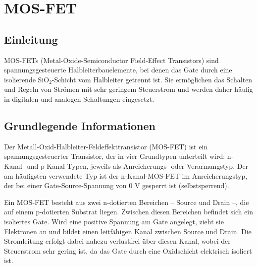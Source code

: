 %
%
%


\chapter{MOS-FET}\label{Mosfet}
\section{Einleitung}
MOS-FETs (Metal-Oxide-Semiconductor Field-Effect Transistors) sind spannungsgesteuerte Halbleiterbauelemente, bei denen das Gate durch eine isolierende SiO$_2$-Schicht vom Halbleiter getrennt ist. Sie ermöglichen das Schalten und Regeln von Strömen mit sehr geringem Steuerstrom und werden daher häufig in digitalen und analogen Schaltungen eingesetzt. \cite{Alles:2024}
\section{Grundlegende Informationen}
Der Metall-Oxid-Halbleiter-Feldeffekttransistor (MOS-FET) ist ein spannungsgesteuerter Transistor, der in vier Grundtypen unterteilt wird: n-Kanal- und p-Kanal-Typen, jeweils als Anreicherungs- oder Verarmungstyp. Der am häufigsten verwendete Typ ist der n-Kanal-MOS-FET im Anreicherungstyp, der bei einer Gate-Source-Spannung von 0 V gesperrt ist (selbstsperrend).\cite{Alles:2024}

Ein MOS-FET besteht aus zwei n-dotierten Bereichen – Source und Drain –, die auf einem p-dotierten Substrat liegen. Zwischen diesen Bereichen befindet sich ein isoliertes Gate. Wird eine positive Spannung am Gate angelegt, zieht sie Elektronen an und bildet einen leitfähigen Kanal zwischen Source und Drain. Die Stromleitung erfolgt dabei nahezu verlustfrei über diesen Kanal, wobei der Steuerstrom sehr gering ist, da das Gate durch eine Oxidschicht elektrisch isoliert ist.\cite{Alles:2024}

